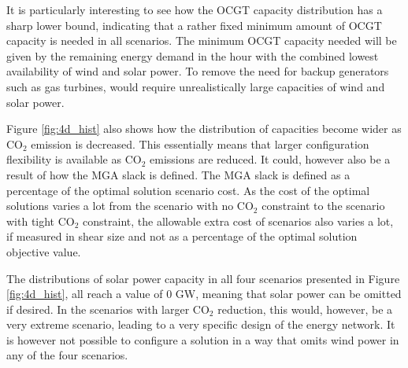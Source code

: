 It is particularly interesting to see how the OCGT capacity distribution has a sharp lower bound, indicating that a rather fixed minimum amount of OCGT capacity is needed in all scenarios. The minimum OCGT capacity needed will be given by the remaining energy demand in the hour with the combined lowest availability of wind and solar power. To remove the need for backup generators such as gas turbines, would require unrealistically large capacities of wind and solar power. 

Figure \ref{fig:4d_hist} also shows how the distribution of capacities become wider as $\text{CO}_2$ emission is decreased. This essentially means that larger configuration flexibility is available as $\text{CO}_2$ emissions are reduced. It could, however also be a result of how the MGA slack is defined. The MGA slack is defined as a percentage of the optimal solution scenario cost. As the cost of the optimal solutions varies a lot from the scenario with no $\text{CO}_2$ constraint to the scenario with tight $\text{CO}_2$ constraint, the allowable extra cost of scenarios also varies a lot, if measured in shear size and not as a percentage of the optimal solution objective value.

The distributions of solar power capacity in all four scenarios presented in Figure \ref{fig:4d_hist}, all reach a value of 0 GW, meaning that solar power can be omitted if desired. In the scenarios with larger $\text{CO}_2$ reduction, this would, however, be a very extreme scenario, leading to a very specific design of the energy network. It is however not possible to configure a solution in a way that omits wind power in any of the four scenarios. 

